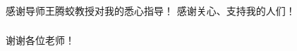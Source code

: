 \begin{transparentFootline_lastpages}
{

\begin{frame}
\frametitle{}
{\color{white}感谢导师王腾蛟教授对我的悉心指导！}
\vfill
{\color{white}感谢关心、支持我的人们！}
\vfill
\end{frame}
}
\end{transparentFootline_lastpages}


\begin{transparentFootline_lastpages}
{

\begin{frame}
\frametitle{}
{\color{white}谢谢各位老师！}
\vfill
\end{frame}
}
\end{transparentFootline_lastpages}